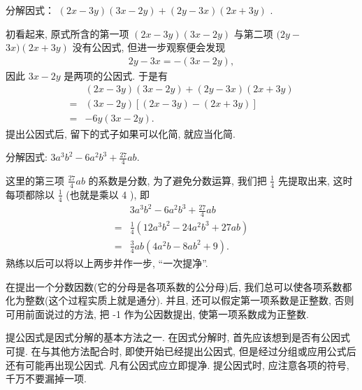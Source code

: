 \begin{example}[仔细观察]\label{ex:提公因式-例5-仔细观察}
	分解因式： $(2 x-3 y)(3 x-2 y)+(2 y-3 x)(2 x+3 y)$ .
\end{example}
\begin{solution}
	初看起来, 原式所含的第一项 $(2 x-3 y)(3 x-2 y)$ 与第二项 $(2 y-$ $3 x)(2 x+3 y)$ 没有公因式, 但进一步观察便会发现
	\begin{align*}
		2 y-3 x=-(3 x-2 y),
	\end{align*}
	因此 $3 x-2 y$ 是两项的公因式. 于是有
	\begin{align*}
		  & (2 x-3 y)(3 x-2 y)+(2 y-3 x)(2 x+3 y) \\
		= & (3 x-2 y)[(2 x-3 y)-(2 x+3 y)]        \\
		= & -6 y(3 x-2 y) .
	\end{align*}
	提出公因式后, 留下的式子如果可以化简, 就应当化简.
\end{solution}

\begin{example}[化“分”为整]\label{ex:提公因式-例6-化分为整}
	分解因式: $3 a^{3} b^{2}-6 a^{2} b^{3}+\frac{27}{4} a b$.
\end{example}
\begin{solution}
	这里的第三项 $\frac{27}{4} a b$ 的系数是分数, 为了避免分数运算, 我们把 $\frac{1}{4}$ 先提取出来, 这时每项都除以 $\frac{1}{4}$ (也就是乘以 4 ), 即
	\begin{align*}
		  & 3 a^{3} b^{2}-6 a^{2} b^{3}+\frac{27}{4} a b                 \\
		= & \frac{1}{4}\left(12 a^{3} b^{2}-24 a^{2} b^{3}+27 a b\right) \\
		= & \frac{3}{4} a b\left(4 a^{2} b-8 a b^{2}+9\right) .
	\end{align*}
	熟练以后可以将以上两步并作一步, “一次提净”.

	在提出一个分数因数(它的分母是各项系数的公分母)后, 我们总可以使各项系数都化为整数(这个过程实质上就是通分). 并且, 还可以假定第一项系数是正整数, 否则可用前面说过的方法, 把 -1 作为公因数提出, 使第一项系数成为正整数.
\end{solution}
\begin{note}
	提公因式是因式分解的基本方法之一. 在因式分解时, 首先应该想到是否有公因式可提. 在与其他方法配合时, 即使开始已经提出公因式, 但是经过分组或应用公式后还有可能再出现公因式. 凡有公因式应立即提净. 提公因式时, 应注意各项的符号, 千万不要漏掉一项.
\end{note}

